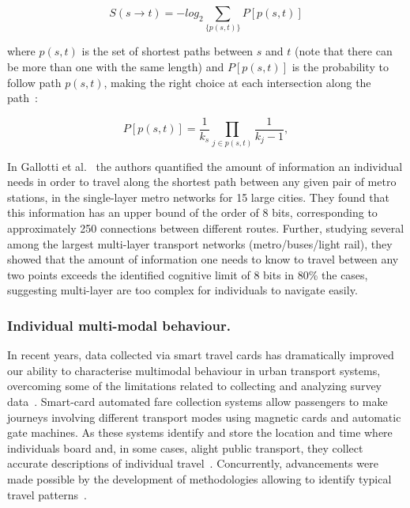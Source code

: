 \begin{equation}
S(s \rightarrow t) = - log_2 \sum_{\{p(s,t)\}} P[p(s,t)]
\end{equation}

where  ${p(s, t)}$ is the set of shortest paths between $s$ and $t$ (note that there can be more than one with the same length) and $P[p(s,t)]$ is the probability to follow path $p(s,t)$, making the right choice at each intersection along the path~\cite{rosvall2005networks}:

\begin{equation}
     P[p(s,t)]=\frac{1}{k_s}\prod_{j\in p(s,t)}\frac{1}{k_j-1}, 
\end{equation}

In Gallotti et al.~\cite{gallotti2016limits} the authors quantified the amount of information an individual needs in order to travel along the shortest path between any given pair of metro stations, in the single-layer metro networks for 15 large cities. They found that this information has an upper bound of the order of 8 bits, corresponding to approximately 250 connections between different routes. Further, studying several among the largest multi-layer transport networks (metro/buses/light rail), they showed that the amount of information one needs to know to travel between any two points exceeds the identified cognitive limit of 8 bits in 80\% the cases, suggesting multi-layer are too complex for individuals to navigate easily.

\subsubsection{Individual multi-modal behaviour.}
In recent years, data collected via smart travel cards has dramatically improved our ability to characterise multimodal behaviour in urban transport systems, overcoming some of the limitations related to collecting and analyzing survey data~\cite{chen2016promises,zannat2019emerging}. Smart-card automated fare collection systems allow passengers to make journeys involving different transport modes using magnetic cards and automatic gate machines. As these systems identify and store the location and time where individuals board and, in some cases, alight public transport, they collect accurate descriptions of individual travel~\cite{pelletier2011smart}. Concurrently, advancements were made possible by the development of methodologies allowing to identify typical travel patterns~\cite{ma2013mining}.


